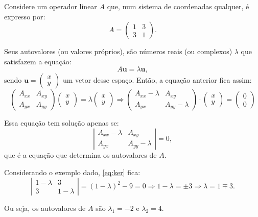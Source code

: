 \documentclass[a4paper,12pt]{article}
\let\vec=\mathbf
\begin{document}
  Considere um operador linear $A$ que, num sistema de coordenadas qualquer, é expresso por:
  \begin{equation*}
  A = \begin{pmatrix}
    1 & 3 \\
    3 & 1
  \end{pmatrix}.
  \end{equation*}
  
  Seus autovalores (ou valores próprios), são números reais (ou complexos) $\lambda$ que satisfazem a equação:
  \begin{equation*}
  A \vec u = \lambda \vec u,
  \end{equation*}
  sendo $\vec u = \begin{pmatrix}x\\y\end{pmatrix}$ um vetor desse espaço.
  Então, a equação anterior fica assim:
  \begin{equation*}
  \begin{pmatrix}
    A_{xx} & A_{xy} \\
    A_{yx} & A_{yy}
  \end{pmatrix}
  \begin{pmatrix}
    x \\
    y
  \end{pmatrix}
  =
  \lambda
  \begin{pmatrix}
    x \\
    y
  \end{pmatrix}
  \Rightarrow
  \begin{pmatrix}
    A_{xx} - \lambda & A_{xy} \\
    A_{yx}           & A_{yy} - \lambda    
  \end{pmatrix}
  \cdot
  \begin{pmatrix}    
    x \\
    y
  \end{pmatrix}  
  =
  \begin{pmatrix}    
    0 \\
    0
  \end{pmatrix}
  \end{equation*}

  Essa equação tem solução apenas se:
  \begin{equation}\label{eq:ker}
  \left|\begin{matrix}
    A_{xx} - \lambda & A_{xy} \\
    A_{yx}           & A_{yy} - \lambda    
  \end{matrix}\right|
  = 0,
  \end{equation}
  que é a equação que determina os autovalores de $A$.
  
  Considerando o exemplo dado, \eqref{eq:ker} fica:
  \begin{equation}
  \left|\begin{matrix}
    1 - \lambda & 3 \\
    3           & 1 - \lambda    
  \end{matrix}\right|
  = (1-\lambda)^2-9 = 0
  \Rightarrow
  1-\lambda = \pm 3
  \Rightarrow
  \lambda = 1 \mp 3.
  \end{equation}
  
  Ou seja, os autovalores de $A$ são $\lambda_1 = -2$ e $\lambda_2 = 4$.
\end{document}

